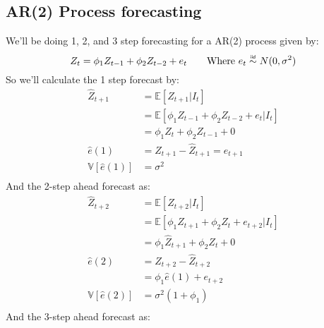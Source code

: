 \subsection{AR(2) Process forecasting}
We'll be doing 1, 2, and 3 step forecasting for a AR(2) process given by:
\begin{equation*}
    Z_{t} = \phi_{1} Z_{t-1} + \phi_{2} Z_{t-2} + e_{t} \qquad \text{Where $e_t \iid N(0, \sigma^2)$}
\end{equation*}
So we'll calculate the 1 step forecast by:
\begin{equation*}
    \begin{aligned}
        \hat{Z}_{t+1} &= \mathbb{E}\left[Z_{t+1} | I_{t}\right] \\
                      &= \mathbb{E}\left[ \phi_{1} Z_{t-1} + \phi_{2} Z_{t-2} +
                      e_{t} | I_{t} \right]  \\
                      &= \phi_{1}Z_{t} + \phi_{2}Z_{t-1} + 0 \\
        \hat{e}(1) &= Z_{t+1} - \hat{Z}_{t+1} = e_{t+1} \\
        \mathbb{V}\left[\hat{e}(1)\right]  &= \sigma^{2}\\
    \end{aligned}
\end{equation*}
And the 2-step ahead forecast as:
\begin{equation*}
    \begin{aligned}
        \hat{Z}_{t+2} &= \mathbb{E}\left[Z_{t+2} | I_{t}\right] \\
                      &= \mathbb{E}\left[ \phi_{1} Z_{t+1} + \phi_{2} Z_{t} +
                      e_{t+2} | I_{t} \right]  \\
                      &= \phi_{1} \hat{Z}_{t+1} + \phi_{2} Z_{t} + 0 \\
        \hat{e}(2) &= Z_{t+2} - \hat{Z}_{t+2} \\
                   &= \phi_{1} \hat{e}(1) + e_{t+2} \\
        \mathbb{V}\left[\hat{e}(2)\right]  &= \sigma^{2} \left( 1 + \phi_{1} \right)\\
    \end{aligned}
\end{equation*}
And the 3-step ahead forecast as:
